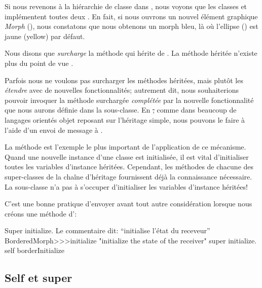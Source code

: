 \documentclass[a4paper,10pt,twoside]{book}
\begin{document}
Si nous revenons à la hiérarchie de classe  dans , nous voyons que les classes  et \mbox{} implémentent toutes deux .
En fait, si nous ouvrons un nouvel élément graphique \emph{Morph} (), nous constatons que nous obtenons un morph bleu, là où l'ellipse () est jaune (yellow) par défaut.

Nous disons que  \emph{surcharge} la méthode  qui hérite de .
La méthode héritée n'existe plus du point de vue .

Parfois nous ne voulons pas surcharger les méthodes héritées, mais plutôt les \emph{étendre} avec de nouvelles fonctionnalités; autrement dit, nous souhaiterions pouvoir invoquer la méthode surchargée \emph{complétée} par la nouvelle fonctionnalité que nous aurons définie dans la sous-classe.
En \st, comme dans beaucoup de langages orientés objet reposant sur l'héritage simple, nous pouvons le faire à l'aide d'un envoi de message à \super.

La méthode  est l'exemple le plus important de l'application de ce mécanisme.
Quand une nouvelle instance d'une classe est initialisée, il est vital
d'initialiser toutes les variables d'instance héritées.
Cependant, les méthodes  de chacune des super-classes
de la chaîne d'héritage fournissent déjà la connaissance nécessaire. 
La sous-classe n'a pas à s'occuper d'initialiser les variables d'instance héritées!

C'est une bonne pratique d'envoyer  avant tout autre considération lorsque nous créons une méthode d':
\arevoir{}%

\begin{method}[morphinit]{Super initialize. Le commentaire dit: ``initialise l'état du receveur''}
BorderedMorph>>>initialize
	"initialize the state of the receiver"
	super initialize.
	self borderInitialize
\end{method}


\subsection{Self et super}
\end{document}
